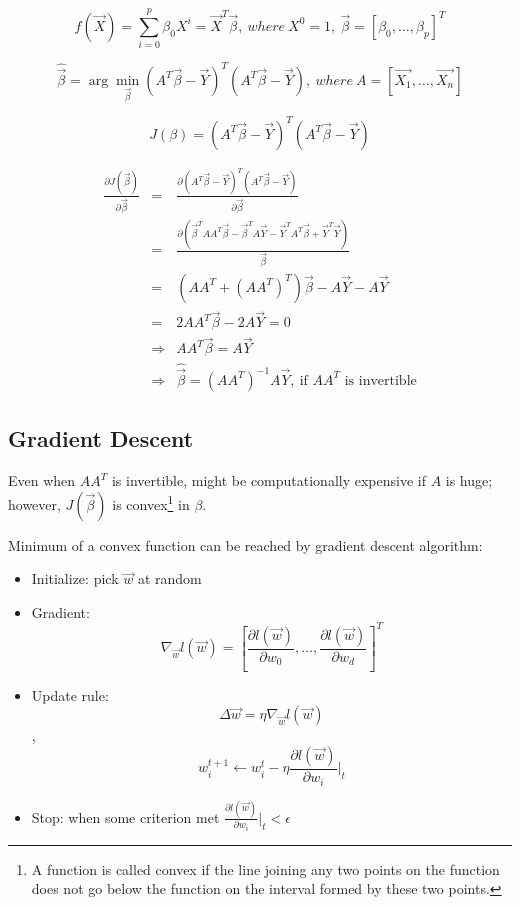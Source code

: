 \documentclass[letterpaper,10pt]{article}
\begin{document}
$$f(\vec{X})=\sum_{i=0}^{p}{\beta_0X^{i}}=\vec{X}^T\vec{\beta},~where~X^0=1,~\vec{\beta}=[\beta_0,\dots,\beta_p]^T$$

$$\hat{\vec{\beta}}=\arg\min_{\vec{\beta}}(A^T\vec{\beta}-\vec{Y})^T(A^T\vec{\beta}-\vec{Y}),~where~A=[\vec{X_1},\dots,\vec{X_n}]$$

$$J(\beta)=(A^T\vec{\beta}-\vec{Y})^T(A^T\vec{\beta}-\vec{Y})$$

\begin{equation*}
\begin{array}{rcl}
\frac{\partial J(\vec{\beta})}{\partial \vec{\beta}} & = & \frac{\partial (A^T\vec{\beta}-\vec{Y})^T(A^T\vec{\beta}-\vec{Y})}{\partial \vec{\beta}} \\
& = & \frac{\partial (\vec{\beta}^TAA^T\vec{\beta}-\vec{\beta}^TA\vec{Y}-\vec{Y}^TA^T\vec{\beta}+\vec{Y}^T\vec{Y})}{\vec{\beta}} \\
& = & (AA^T+(AA^T)^T)\vec{\beta}-A\vec{Y}-A\vec{Y} \\
& = & 2AA^T\vec{\beta}-2A\vec{Y} = 0 \\
& \Rightarrow & AA^T\vec{\beta}=A\vec{Y} \\
& \Rightarrow & \hat{\vec{\beta}}=(AA^T)^{-1}A\vec{Y},~\text{if $AA^T$ is invertible}
\end{array}
\end{equation*}

\subsection{Gradient Descent}

Even when $AA^T$ is invertible, might be computationally expensive if $A$ is huge; however, $J(\vec{\beta})$ is convex\footnote{A function is called convex if the line joining any two points on the function does not go below the function on the interval formed by these two points.} in $\beta$.

Minimum of a convex function can be reached by gradient descent algorithm:
\begin{itemize}
	\item Initialize: pick $\vec{w}$ at random
	\item Gradient: $$\nabla_{\vec{w}} l(\vec{w})=[\frac{\partial l(\vec{w})}{\partial w_0},\dots,\frac{\partial l(\vec{w})}{\partial w_d}]^T$$
	\item Update rule: $$\Delta \vec{w}=\eta \nabla_{\vec{w}}l(\vec{w})$$, $$w_i^{t+1} \leftarrow w_i^t - \eta \frac{\partial l(\vec{w})}{\partial w_i}|_t$$
	\item Stop: when some criterion met $\frac{\partial l(\vec{w})}{\partial w_i}|_t < \epsilon$
\end{itemize}
\end{document}
